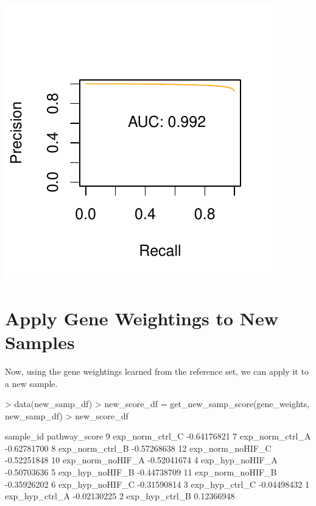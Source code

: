 \documentclass{article}
\begin{document}
\begin{Schunk}
\end{Schunk}
\includegraphics{ssPATHS-010}

\section{Apply Gene Weightings to New Samples}
Now, using the gene weightings learned from the reference set, we can apply
it to a new sample.
\begin{Schunk}
\begin{Sinput}
> data(new_samp_df)
> new_score_df = get_new_samp_score(gene_weights, new_samp_df)
> new_score_df
\end{Sinput}
\begin{Soutput}
          sample_id pathway_score
9   exp_norm_ctrl_C   -0.64176821
7   exp_norm_ctrl_A   -0.62781700
8   exp_norm_ctrl_B   -0.57268638
12 exp_norm_noHIF_C   -0.52251848
10 exp_norm_noHIF_A   -0.52041674
4   exp_hyp_noHIF_A   -0.50703636
5   exp_hyp_noHIF_B   -0.44738709
11 exp_norm_noHIF_B   -0.35926202
6   exp_hyp_noHIF_C   -0.31590814
3    exp_hyp_ctrl_C   -0.04498432
1    exp_hyp_ctrl_A   -0.02130225
2    exp_hyp_ctrl_B    0.12366948
\end{Soutput}
\end{Schunk}
\end{document}
